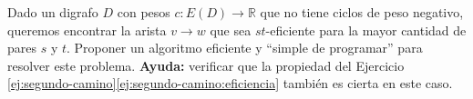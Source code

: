 
 \item Dado un digrafo $D$ con pesos $c\colon E(D) \to \mathbb{R}$ que no tiene ciclos de peso negativo, queremos encontrar la arista $v \to w$ que sea $st$-eficiente para la mayor cantidad de pares $s$ y $t$.  Proponer un algoritmo eficiente y ``simple de programar'' para resolver este problema.  \textbf{Ayuda:} verificar que la propiedad del Ejercicio \ref{ej:segundo-camino}\ref{ej:segundo-camino:eficiencia} también es cierta en este caso.


